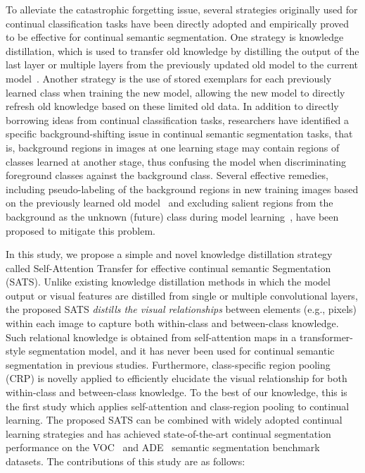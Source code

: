 \documentclass[onecolumn,conference,compsoc]{IEEEtran}
\begin{document}
\begin{spacing}{1.5}
To alleviate the catastrophic forgetting issue, several strategies originally {used} for continual classification tasks have been directly adopted and empirically proved {to be} effective for continual semantic segmentation. One strategy is knowledge distillation, which {is used to} transfer old knowledge by distilling the output of the last layer or multiple layers from the previously updated old model to the current model~\cite{PLOP,PLOPLong}. Another strategy is the {use} of stored exemplars for each previously learned class when training the new model, allowing the new model to directly refresh old knowledge based on these limited old data. {In addition to} directly borrowing ideas from continual classification {tasks}, researchers {have identified} a specific background-shifting issue in continual semantic segmentation tasks, {that is,} background regions in images at one learning stage may contain regions of classes learned at another stage, thus confusing the model when {discriminating} foreground classes against the background class. {Several} effective remedies, including pseudo-labeling of the background regions in new training images based on the previously learned old model~\cite{PLOP, ST-CIL, SSUL} {and} excluding salient regions from the background as {the} unknown (future) class during model learning~\cite{SSUL}{, have been proposed to mitigate this problem}.

In this study, we propose a simple {and} novel knowledge distillation strategy called Self-Attention Transfer for effective continual semantic Segmentation (SATS). {Unlike} existing knowledge distillation methods {in} which {the} model output or visual features {are distilled} from single or multiple convolutional layers, the proposed SATS \textit{distills the visual relationships} between elements (e.g., pixels) within each image {to} capture both within-class and between-class knowledge. Such relational knowledge is obtained from self-attention maps in a transformer-style segmentation model, and it has never been used for continual semantic segmentation in previous studies. {Furthermore,} class-specific region pooling (CRP) is novelly applied to efficiently {elucidate} the visual relationship for both within-class and between-class knowledge. To {the best of} our knowledge, this is the first {study which applies} self-attention and class-region pooling to continual learning. {The proposed SATS can be combined with} widely adopted continual learning strategies {and has achieved} state-of-the-art continual segmentation performance on the VOC~\cite{VOC} and ADE~\cite{ADE20K} semantic segmentation benchmark datasets. The contributions of this study are {as follows}:


\end{spacing}
\end{document}

